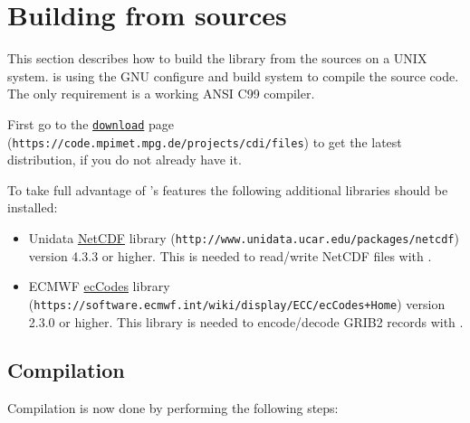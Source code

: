 \section{\label{build}Building from sources}

This section describes how to build the {\CDI} library from the sources on a UNIX system.
{\CDI} is using the GNU configure and build system to compile the source code.
The only requirement is a working ANSI C99 compiler.

First go to the \href{https://code.mpimet.mpg.de/projects/cdi/files}{\texttt{download}} page
(\texttt{https://code.mpimet.mpg.de/projects/cdi/files}) to get the latest distribution,
if you do not already have it.

To take full advantage of {\CDI}'s features the following additional libraries should be installed:

\begin{itemize}
\item Unidata \href{http://www.unidata.ucar.edu/packages/netcdf}{NetCDF} library
      (\texttt{http://www.unidata.ucar.edu/packages/netcdf})
      version 4.3.3 or higher.
      This is needed to read/write NetCDF files with {\CDI}. 
\item ECMWF \href{https://software.ecmwf.int/wiki/display/ECC/ecCodes+Home}{ecCodes} library
      (\texttt{https://software.ecmwf.int/wiki/display/ECC/ecCodes+Home})
      version 2.3.0 or higher.
      This library is needed to encode/decode GRIB2 records with {\CDI}. 
\end{itemize}


\subsection{Compilation}

Compilation is now done by performing the following steps:

